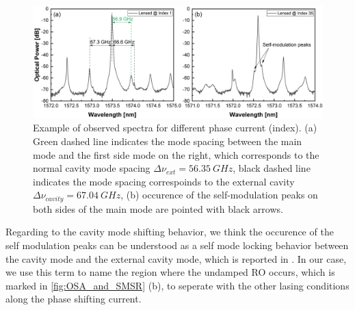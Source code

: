 \begin{figure}[ht]
    \centering
    \includegraphics[width=\linewidth]{figures/spectra_lensed_4621.png}
    \caption{Example of observed spectra for different phase current (index). (a) Green dashed line indicates the mode spacing between the main mode and the first side mode on the right, which corresponds to the normal cavity mode spacing $\Delta\nu_{ext}=56.35 \ GHz$, black dashed line indicates the mode spacing correspoinds to the external cavity $\Delta\nu_{cavity}=67.04 \ GHz$, (b) occurence of the self-modulation peaks on both sides of the main mode are pointed with black arrows.}
    \label{fig:spectra_lensed_4621}
\end{figure}

Regarding to the cavity mode shifting behavior, we think the occurence of the self modulation peaks can be understood as a self mode locking behavior between the cavity mode and the external cavity mode, which is reported in \cite{tager1994high}. In our case, we use this term to name the region where the undamped RO occurs, which is marked in \autoref{fig:OSA_and_SMSR} (b), to seperate with the other lasing conditions along the phase shifting current.

